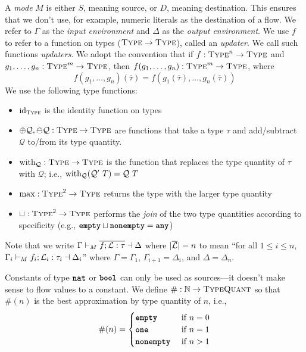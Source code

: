 \documentclass[nonacm, dvipsnames, sigconf]{acmart}
\renewcommand{\id}[1]{\text{id}_{#1}}
\begin{document}
A \emph{mode} $M$ is either $S$, meaning source, or $D$, meaning destination.
This ensures that we don't use, for example, numeric literals as the destination of a flow.
We refer to $\Gamma$ as the \emph{input environment} and $\Delta$ as the \emph{output environment}.
We use $f$ to refer to a function on types ($\textsc{Type} \to \textsc{Type}$), called an \emph{updater}.
We call such functions \emph{updaters}.
We adopt the convention that if $f : \textsc{Type}^n \to \textsc{Type}$ and $g_1,\ldots,g_n : \textsc{Type}^m \to \textsc{Type}$, then $f(g_1, \ldots, g_n) : \textsc{Type}^m \to \textsc{Type}$, where
\[
    f(g_1, \ldots, g_n)(\overline{\tau}) = f(g_1(\overline{\tau}), \ldots, g_n(\overline{\tau}))
\]
We use the following type functions:
\begin{itemize}
    \item $\id{\types}$ is the identity function on types
    \item $\oplus \mathcal{Q}, \ominus \mathcal{Q} : \textsc{Type} \to \textsc{Type}$ are functions that take a type $\tau$ and add/subtract $\mathcal{Q}$ to/from its type quantity.
    \item $\text{with}_{\mathcal{Q}} : \textsc{Type} \to \textsc{Type}$ is the function that replaces the type quantity of $\tau$ with $\mathcal{Q}$; i.e., $\text{with}_{\mathcal{Q}}(\mathcal{Q}'~T) = \mathcal{Q}~T$
    \item $\max : \textsc{Type}^2 \to \textsc{Type}$ returns the type with the larger type quantity
    \item $\sqcup : \textsc{Type}^2 \to \textsc{Type}$ performs the \emph{join} of the two type quantities according to specificity (e.g., $\textbf{\texttt{empty}} \sqcup \textbf{\texttt{nonempty}} = \textbf{\texttt{any}}$)
\end{itemize}

Note that we write $\Gamma \vdash_M \overline{f ; \mathcal{L} : \tau} \dashv \Delta$ where $|\overline{\mathcal{L}}| = n$ to mean
``for all $1 \leq i \leq n$, $\Gamma_i \vdash_M f_i ; \mathcal{L}_i : \tau_i \dashv \Delta_i$'' where $\Gamma = \Gamma_1$, $\Gamma_{i+1} = \Delta_{i}$, and $\Delta = \Delta_n$.

Constants of type $\textbf{\texttt{nat}}$ or $\textbf{\texttt{bool}}$ can only be used as sources---it doesn't make sense to flow values to a constant.
We define $\# : \mathbb{N} \to \textsc{TypeQuant}$ so that $\#(n)$ is the best approximation by type quantity of $n$, i.e.,
\[
    \#(n) =
    \begin{cases}
        \textbf{\texttt{empty}} & ~\text{if}~ n = 0 \\
        \textbf{\texttt{one}} & ~\text{if}~ n = 1 \\
        \textbf{\texttt{nonempty}} & ~\text{if}~ n > 1 \\
    \end{cases}
\]
\end{document}
